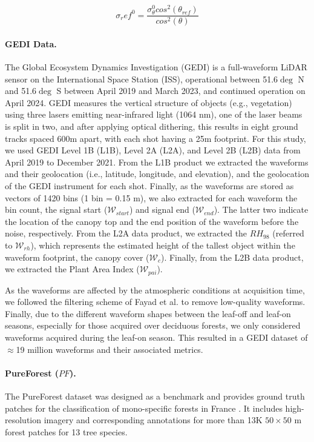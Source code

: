 \begin{equation}
    \sigma_ref^0 = \frac{\sigma_\theta^0 cos^2(\theta_{ref})}{cos^2(\theta)}
\end{equation}

\paragraph{GEDI Data.} The Global Ecosystem Dynamics Investigation (GEDI) is a full-waveform LiDAR sensor on the International Space Station (ISS), operational between 51.6$\deg$ N and 51.6$\deg$ S between April 2019 and March 2023, and continued operation on April 2024. GEDI measures the vertical structure of objects (e.g., vegetation) using three lasers emitting near-infrared light (1064 nm), one of the laser beams is split in two, and after applying optical dithering, this results in eight ground tracks spaced 600m apart, with each shot having a 25m footprint. For this study, we used GEDI Level 1B (L1B), Level 2A (L2A), and Level 2B (L2B) data from April 2019 to December 2021. From the L1B product we extracted the waveforms and their geolocation (i.e., latitude, longitude, and elevation), and the geolocation of the GEDI instrument for each shot. Finally, as the waveforms are stored as vectors of 1420 bins (1 bin = 0.15 m), we also extracted for each waveform the bin count, the signal start ($\mathcal{W}_{start}$) and signal end ($\mathcal{W}_{end}$). The latter two indicate the location of the canopy top and the end position of the waveform before the noise, respectively. From the L2A data product, we extracted the $RH_{98}$ (referred to $\mathcal{W}_{rh}$), which represents the estimated height of the tallest object within the waveform footprint, the canopy cover ($\mathcal{W}_{c}$). Finally, from the L2B data product, we extracted the Plant Area Index ($\mathcal{W}_{pai}$). 

As the waveforms are affected by the atmospheric conditions at acquisition time, we followed the filtering scheme of Fayad et al.  to remove low-quality waveforms. Finally, due to the different waveform shapes between the leaf-off and leaf-on seasons, especially for those acquired over deciduous forests, we only considered waveforms acquired during the leaf-on season. This resulted in a GEDI dataset of $\approx$19 million waveforms and their associated metrics. 

\paragraph{PureForest ($PF$).}The PureForest dataset was designed as a benchmark and provides ground truth patches for the classification of mono-specific forests in France \cite{gaydon2024pureforest}. It includes high-resolution imagery and corresponding annotations for more than 13K $50 \times 50$ m forest patches for 13 tree species.

